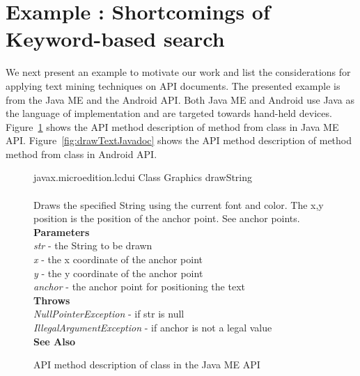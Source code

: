 \section{Example : Shortcomings of Keyword-based search}
\label{sec:example}

We next present an example to motivate our work and list the considerations for applying text mining techniques on API documents. 
The presented example is from the Java ME and the Android API. Both Java ME and Android use Java as the language of implementation and are targeted towards hand-held devices.
Figure~\ref{fig:drawStringJavadoc} shows the API method description
of  method from
 class in Java ME API.
Figure~\ref{fig:drawTextJavadoc} shows the API method description
of method  method from
 class in Android API.

\begin{figure}
	\begin{framed}
		\begin{small}
			{\small javax.microedition.lcdui} {\normalsize Class Graphics} {\large drawString}\\
			\\
			Draws the specified String using the current font and color. The x,y position is the position of the anchor point. See anchor points.\\
			\textbf{Parameters}\\
			\textit{str} - the String to be drawn\\
			\textit{x} - the x coordinate of the anchor point\\
			\textit{y} - the y coordinate of the anchor point\\
			\textit{anchor} - the anchor point for positioning the text\\
			\textbf{Throws}\\
			\textit{NullPointerException} - if str is null\\
			\textit{IllegalArgumentException} - if anchor is not a legal value\\
			\textbf{See Also}\\
		\end{small}
	\end{framed}
	\caption{ API method description of  class in the Java ME API}
	\label{fig:drawStringJavadoc}
\end{figure}


